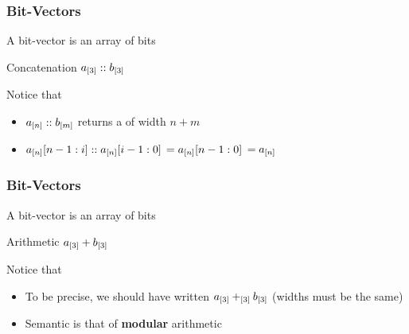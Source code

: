 \begin{frame}
  \frametitle{Bit-Vectors}
  
  A bit-vector is an array of bits 
  \smallskip \\
  \begin{center}
  \scalebox{.3}{}
  \end{center} 
  \vfill

  Concatenation $a_{[3]} :: b_{[3]}$ 
  \smallskip \\
  \begin{center}
  \scalebox{.3}{} 
  \end{center}

  \vfill
  \pause

  Notice that
  \begin{itemize}
    \item $a_{[n]} :: b_{[m]}$ returns a \bitvector of width $n+m$ \pause
    \item $a_{[n]}[n-1:i] :: a_{[n]}[i-1:0]$ \pause $= a_{[n]}[n-1:0]$ \pause $= a_{[n]}$
  \end{itemize}

\end{frame}

\begin{frame}
  \frametitle{Bit-Vectors}
  
  A bit-vector is an array of bits 
  \smallskip \\
  \begin{center}
  \scalebox{.3}{}
  \end{center} 
  \vfill

  Arithmetic $a_{[3]} + b_{[3]}$ 
  \smallskip \\
  \begin{center}
  \scalebox{.3}{} 
  \end{center}

  \vfill
  \pause

  Notice that
  \begin{itemize}
    \item To be precise, we should have written $a_{[3]} +_{[3]} b_{[3]}$ (widths must be the same)
    \item Semantic is that of {\bf modular} arithmetic
  \end{itemize}

\end{frame}

